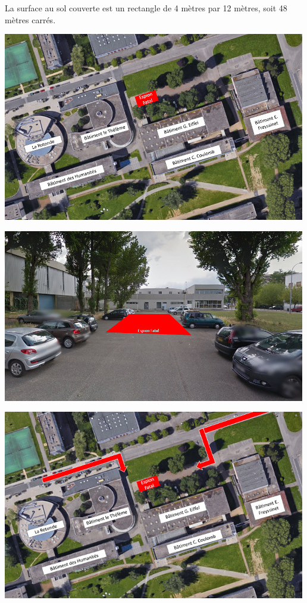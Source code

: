\documentclass[hidelinks, paper=a4, fontsize=13pt]{report}
\begin{document}
La surface au sol couverte est un rectangle de 4 mètres par 12 mètres, soit 48 mètres carrés.
\begin{center}
\includegraphics[scale=1,keepaspectratio]{Annexes/Images/Vue_aerienne_Espion_Fatal}
\end{center}
\begin{center}
\includegraphics[scale=1,keepaspectratio]{Annexes/Images/Vue_Espion_Fatal}
\end{center}
\begin{center}
\includegraphics[scale=1,keepaspectratio]{Annexes/Images/Pompier_Espion_Fatal}
\end{center}
\end{document}
